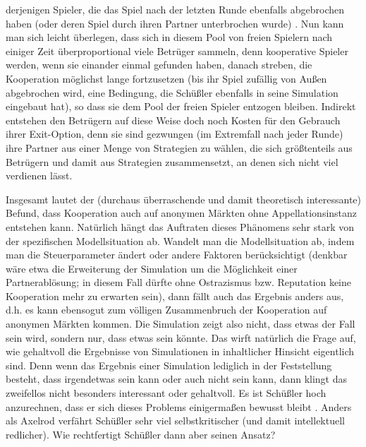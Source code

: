 \documentclass[12pt,a4paper,ngerman]{article}
\begin{document}
derjenigen Spieler, die das Spiel nach der letzten Runde ebenfalls
abgebrochen haben (oder deren Spiel durch ihren Partner unterbrochen
wurde) \cite[S. 66ff.]{schuessler:1997}.  Nun kann man sich leicht
überlegen, dass sich in diesem Pool von freien Spielern nach einiger
Zeit überproportional viele Betrüger sammeln, denn kooperative Spieler
werden, wenn sie einander einmal gefunden haben, danach streben, die
Kooperation möglichst lange fortzusetzen (bis ihr Spiel zufällig von
Außen abgebrochen wird, eine Bedingung, die Schüßler ebenfalls in
seine Simulation eingebaut hat), so dass sie dem Pool der freien
Spieler entzogen bleiben. Indirekt entstehen den Betrügern auf diese
Weise doch noch Kosten für den Gebrauch ihrer Exit-Option, denn sie
sind gezwungen (im Extremfall nach jeder Runde) ihre Partner aus einer
Menge von Strategien zu wählen, die sich größtenteils aus Betrügern
und damit aus Strategien zusammensetzt, an denen sich nicht viel
verdienen lässt.

Insgesamt lautet der (durchaus überraschende und damit theoretisch
interessante) Befund, dass Kooperation auch auf anonymen Märkten ohne
Appellationsinstanz entstehen kann. Natürlich hängt das Auftraten
dieses Phänomens sehr stark von der spezifischen Modellsituation
ab. Wandelt man die Modellsituation ab, indem man die Steuerparameter
ändert oder andere Faktoren berücksichtigt (denkbar wäre etwa die
Erweiterung der Simulation um die Möglichkeit einer Partnerablösung;
in diesem Fall dürfte ohne Ostrazismus bzw. Reputation keine
Kooperation mehr zu erwarten sein), dann fällt auch das Ergebnis
anders aus, d.h. es kann ebensogut zum völligen Zusammenbruch der
Kooperation auf anonymen Märkten kommen. Die Simulation zeigt also
nicht, dass etwas der Fall sein wird, sondern nur, dass etwas sein
könnte. Das wirft natürlich die Frage auf, wie gehaltvoll die
Ergebnisse von Simulationen in inhaltlicher Hinsicht eigentlich
sind. Denn wenn das Ergebnis einer Simulation lediglich in der
Feststellung besteht, dass irgendetwas sein kann oder auch nicht sein
kann, dann klingt das zweifellos nicht besonders interessant oder
gehaltvoll. Es ist Schüßler hoch anzurechnen, dass er sich dieses
Problems einigermaßen bewusst bleibt \cite[S. 91/92]{schuessler:1997}. 
Anders als Axelrod verfährt Schüßler
sehr viel selbstkritischer (und damit intellektuell redlicher).  Wie
rechtfertigt Schüßler dann aber seinen Ansatz?
\end{document}
